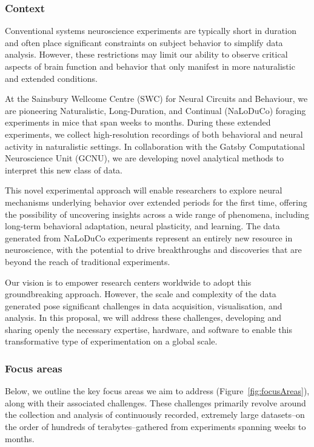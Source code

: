 \subsubsection{Context}

Conventional systems neuroscience experiments are typically short in duration
and often place significant constraints on subject behavior to simplify data
analysis.
%
However, these restrictions may limit our ability to observe critical
aspects of brain function and behavior that only manifest in more naturalistic
and extended conditions.

At the Sainsbury Wellcome Centre (SWC) for Neural Circuits and Behaviour, we
are pioneering Naturalistic, Long-Duration, and Continual (NaLoDuCo) foraging
experiments in mice that span weeks to months. During these extended
experiments, we collect high-resolution recordings of both behavioral and
neural activity in naturalistic settings.
%
In collaboration with the Gatsby Computational Neuroscience Unit (GCNU), we are
developing novel analytical methods to interpret this new class of data.

This novel experimental approach will enable researchers to explore neural
mechanisms underlying behavior over extended periods for the first time,
offering the possibility of uncovering insights across a wide range of
phenomena, including long-term behavioral adaptation, neural plasticity, and
learning.
%
The data generated from NaLoDuCo experiments represent an entirely
new resource in neuroscience, with the potential to drive breakthroughs and
discoveries that are beyond the reach of traditional experiments.

Our vision is to empower research centers worldwide to adopt this
groundbreaking approach.
%
However, the scale and complexity of the data generated pose significant
challenges in data acquisition, visualisation, and analysis.
%
In this proposal, we will address these challenges, developing and sharing
openly the necessary expertise, hardware, and software to enable this
transformative type of experimentation on a global scale.

\subsubsection{Focus areas}

Below, we outline the key focus areas we aim to address
(Figure~\ref{fig:focusAreas}), along with their associated challenges.
%
These challenges primarily revolve around the collection and analysis of
continuously recorded, extremely large datasets--on the order of hundreds of
terabytes--gathered from experiments spanning weeks to months.

